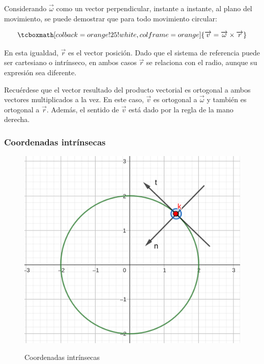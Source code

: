 \documentclass{article}
\begin{document}
Considerando $\overrightarrow{\omega}$ como un vector perpendicular, instante a instante, al plano del movimiento, se puede demostrar que para todo movimiento circular:

\begin{equation}
\tcboxmath[colback=orange!25!white,colframe=orange]{
\overrightarrow{v} = \overrightarrow{\omega} \times \overrightarrow{r}
}
\end{equation}

En esta igualdad, $\overrightarrow{r}$ es el vector posición. Dado que el sistema de referencia puede ser cartesiano o intrínseco, en ambos casos $\overrightarrow{r}$ se relaciona con el radio, aunque su expresión sea diferente.

Recuérdese que el vector resultado del producto vectorial es ortogonal a ambos vectores multiplicados a la vez. En este caso, $\overrightarrow{v}$ es ortogonal a $\overrightarrow{\omega}$ y también es ortogonal a $\overrightarrow{r}$. Además, el sentido de $\overrightarrow{v}$ está dado por la regla de la mano derecha.

\subsubsection{Coordenadas intrínsecas}

\begin{figure}[ht]
\centering
\caption{Coordenadas intrínsecas}
\includegraphics[scale=1]{../../common/img/62.01/theory/01-kinematics-intrinsic-coords.png}
\label{fig:intrinsicCoords}
\end{figure}
\end{document}
